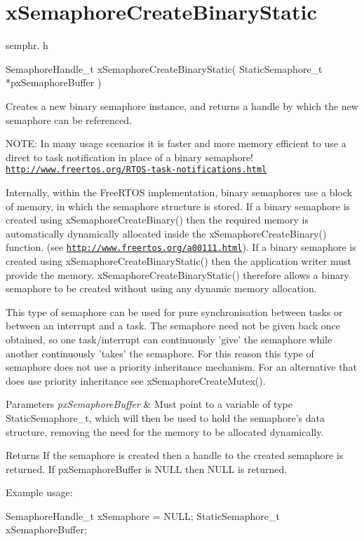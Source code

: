 \hypertarget{group__xSemaphoreCreateBinaryStatic}{\section{x\-Semaphore\-Create\-Binary\-Static}
\label{group__xSemaphoreCreateBinaryStatic}
}
semphr. h 
\begin{DoxyPre}SemaphoreHandle\_t xSemaphoreCreateBinaryStatic( StaticSemaphore\_t *pxSemaphoreBuffer )\end{DoxyPre}


Creates a new binary semaphore instance, and returns a handle by which the new semaphore can be referenced.

N\-O\-T\-E\-: In many usage scenarios it is faster and more memory efficient to use a direct to task notification in place of a binary semaphore! \href{http://www.freertos.org/RTOS-task-notifications.html}{\tt http\-://www.\-freertos.\-org/\-R\-T\-O\-S-\/task-\/notifications.\-html}

Internally, within the Free\-R\-T\-O\-S implementation, binary semaphores use a block of memory, in which the semaphore structure is stored. If a binary semaphore is created using x\-Semaphore\-Create\-Binary() then the required memory is automatically dynamically allocated inside the x\-Semaphore\-Create\-Binary() function. (see \href{http://www.freertos.org/a00111.html}{\tt http\-://www.\-freertos.\-org/a00111.\-html}). If a binary semaphore is created using x\-Semaphore\-Create\-Binary\-Static() then the application writer must provide the memory. x\-Semaphore\-Create\-Binary\-Static() therefore allows a binary semaphore to be created without using any dynamic memory allocation.

This type of semaphore can be used for pure synchronisation between tasks or between an interrupt and a task. The semaphore need not be given back once obtained, so one task/interrupt can continuously 'give' the semaphore while another continuously 'takes' the semaphore. For this reason this type of semaphore does not use a priority inheritance mechanism. For an alternative that does use priority inheritance see x\-Semaphore\-Create\-Mutex().


\begin{DoxyParams}{Parameters}
{\em px\-Semaphore\-Buffer} & Must point to a variable of type Static\-Semaphore\-\_\-t, which will then be used to hold the semaphore's data structure, removing the need for the memory to be allocated dynamically.\\
\hline
\end{DoxyParams}
\begin{DoxyReturn}{Returns}
If the semaphore is created then a handle to the created semaphore is returned. If px\-Semaphore\-Buffer is N\-U\-L\-L then N\-U\-L\-L is returned.
\end{DoxyReturn}
Example usage\-: 
\begin{DoxyPre}
 SemaphoreHandle\_t xSemaphore = NULL;
 StaticSemaphore\_t xSemaphoreBuffer;\end{DoxyPre}



